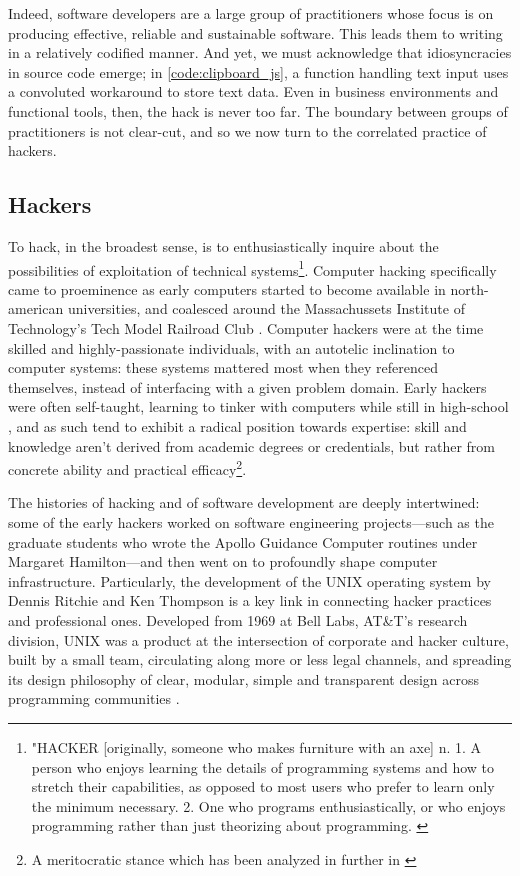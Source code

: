 Indeed, software developers are a large group of practitioners whose focus is on producing effective, reliable and sustainable software. This leads them to writing in a relatively codified manner. And yet, we must acknowledge that idiosyncracies in source code emerge; in \autoref{code:clipboard_js}, a function handling text input uses a convoluted workaround to store text data. Even in business environments and functional tools, then, the hack is never too far. The boundary between groups of practitioners is not clear-cut, and so we now turn to the correlated practice of hackers.

\subsection{Hackers}
\label{subsec:hackers}

To hack, in the broadest sense, is to enthusiastically inquire about the possibilities of exploitation of technical systems\footnote{"HACKER [originally, someone who makes furniture with an axe] n. 1. A person who enjoys learning the details of programming systems and how to stretch their capabilities, as opposed to most users who prefer to learn only the minimum necessary. 2. One who programs enthusiastically, or who enjoys programming rather than just theorizing about programming. \citep{dourish_original_1988}}. Computer hacking specifically came to proeminence as early computers started to become available in north-american universities, and coalesced around the Massachussets Institute of Technology's Tech Model Railroad Club \citep{levy_hackers_2010}. Computer hackers were at the time skilled and highly-passionate individuals, with an autotelic inclination to computer systems: these systems mattered most when they referenced themselves, instead of interfacing with a given problem domain. Early hackers were often self-taught, learning to tinker with computers while still in high-school \citep{lammers_programmers_1986}, and as such tend to exhibit a radical position towards expertise: skill and knowledge aren't derived from academic degrees or credentials, but rather from concrete ability and practical efficacy\footnote{A meritocratic stance which has been analyzed in further in  \citep{coleman_aesthetics_2018}}.

The histories of hacking and of software development are deeply intertwined: some of the early hackers worked on software engineering projects—such as the graduate students who wrote the Apollo Guidance Computer routines under Margaret Hamilton—and then went on to profoundly shape computer infrastructure. Particularly, the development of the UNIX operating system by Dennis Ritchie and Ken Thompson is a key link in connecting hacker practices and professional ones. Developed from 1969 at Bell Labs, AT\&T's research division, UNIX was a product at the intersection of corporate and hacker culture, built by a small team, circulating along more or less legal channels, and spreading its design philosophy of clear, modular, simple and transparent design across programming communities \citep{raymond_art_2003}.

